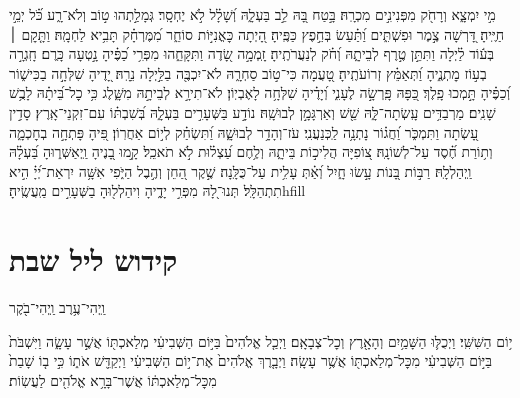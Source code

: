 מִ֣י יִמְצָ֑א וְרָחֹ֖ק מִפְּנִינִ֣ים מִכְרָֽהּ׃ \hfill\break
בָּ֣טַח בָּ֭הּ לֵ֣ב בַּעְלָ֑הּ וְ֝שָׁלָ֗ל לֹ֣א יֶחְסָֽר׃ \hfill\break
גְּמָלַ֣תְהוּ ט֣וֹב וְלֹא־רָ֑ע כֹּ֗֝ל יְמֵ֣י חַיֶּֽיהָ׃ \hfill\break
דָּ֭רְשָׁה צֶ֣מֶר וּפִשְׁתִּ֑ים וַ֝תַּ֗עַשׂ בְּחֵ֣פֶץ כַּפֶּֽיהָ׃ \hfill\break
הָ֭יְתָה כׇּאֳנִיּ֣וֹת סוֹחֵ֑ר מִ֝מֶּרְחָ֗ק תָּבִ֥יא לַחְמָֽהּ׃ \hfill\break
וַתָּ֤קׇם ׀ בְּע֬וֹד לַ֗יְלָה וַתִּתֵּ֣ן טֶ֣רֶף לְבֵיתָ֑הּ וְ֝חֹ֗ק לְנַעֲרֹתֶֽיהָ׃ \hfill\break
זָֽמְמָ֣ה שָׂ֭דֶה וַתִּקָּחֵ֑הוּ מִפְּרִ֥י כַ֝פֶּ֗יהָ נָ֣טְעָה כָּֽרֶם׃ \hfill\break
חָֽגְרָ֣ה בְע֣וֹז מׇתְנֶ֑יהָ וַ֝תְּאַמֵּ֗ץ זְרוֹעֹתֶֽיהָ׃ \hfill\break
טָ֭עֲמָה כִּי־ט֣וֹב סַחְרָ֑הּ לֹא־יִכְבֶּ֖ה בַלַּ֣יְלָה נֵרָֽהּ׃ \hfill\break
יָ֭דֶיהָ שִׁלְּחָ֣ה בַכִּישׁ֑וֹר וְ֝כַפֶּ֗יהָ תָּ֣מְכוּ פָֽלֶךְ׃ \hfill\break
כַּ֭פָּהּ פָּֽרְשָׂ֣ה לֶעָנִ֑י וְ֝יָדֶ֗יהָ שִׁלְּחָ֥ה לָאֶבְיֽוֹן׃ \hfill\break
לֹא־תִירָ֣א לְבֵיתָ֣הּ מִשָּׁ֑לֶג כִּ֥י כׇל־בֵּ֝יתָ֗הּ לָבֻ֥שׁ שָׁנִֽים׃ \hfill\break
מַרְבַדִּ֥ים עָֽשְׂתָה־לָּ֑הּ שֵׁ֖שׁ וְאַרְגָּמָ֣ן לְבוּשָֽׁהּ׃ \hfill\break
נוֹדָ֣ע בַּשְּׁעָרִ֣ים בַּעְלָ֑הּ בְּ֝שִׁבְתּ֗וֹ עִם־זִקְנֵי־אָֽרֶץ׃ \hfill\break
סָדִ֣ין עָ֭שְׂתָה וַתִּמְכֹּ֑ר וַ֝חֲג֗וֹר נָתְנָ֥ה לַֽכְּנַעֲנִֽי׃ \hfill\break
עֹז־וְהָדָ֥ר לְבוּשָׁ֑הּ וַ֝תִּשְׂחַ֗ק לְי֣וֹם אַחֲרֽוֹן׃ \hfill\break
פִּ֭יהָ פָּתְחָ֣ה בְחׇכְמָ֑ה וְת֥וֹרַת חֶ֝֗סֶד עַל־לְשׁוֹנָֽהּ׃ \hfill\break
צ֭וֹפִיָּה הֲלִיכ֣וֹת בֵּיתָ֑הּ וְלֶ֥חֶם עַ֝צְל֗וּת לֹ֣א תֹאכֵֽל׃ \hfill\break
קָ֣מוּ בָ֭נֶיהָ וַֽיְאַשְּׁר֑וּהָ בַּ֝עְלָ֗הּ וַֽיְהַלְלָֽהּ׃ \hfill\break
רַבּ֣וֹת בָּ֭נוֹת עָ֣שׂוּ חָ֑יִל וְ֝אַ֗תְּ עָלִ֥ית עַל־כֻּלָּֽנָה׃ \hfill\break
שֶׁ֣קֶר הַ֭חֵן וְהֶ֣בֶל הַיֹּ֑פִי אִשָּׁ֥ה יִרְאַת־יְ֝יָ֗ הִ֣יא תִתְהַלָּֽל׃ \hfill\break
תְּנוּ־לָ֭הּ מִפְּרִ֣י יָדֶ֑יהָ וִיהַלְל֖וּהָ בַשְּׁעָרִ֣ים מַֽעֲשֶֽׂיהָ׃hfill \break


\section[קידוש ליל שבת]{ קידוש ליל שבת }

\label{shabbatkiddush}
\begin{footnotesize}וַֽיְהִי־עֶ֥רֶב וַֽיְהִי־בֹ֖קֶר\end{footnotesize}
י֥וֹם הַשִּׁשִּֽׁי׃ וַיְכֻלּ֛וּ הַשָּׁמַ֥יִם וְהָאָ֖רֶץ וְכׇל־צְבָאָֽם׃ וַיְכַ֤ל אֱלֹהִים֙ בַּיּ֣וֹם הַשְּׁבִיעִ֔י מְלַאכְתּ֖וֹ אֲשֶׁ֣ר עָשָׂ֑ה וַיִּשְׁבֹּת֙ בַּיּ֣וֹם הַשְּׁבִיעִ֔י מִכׇּל־מְלַאכְתּ֖וֹ אֲשֶׁ֥ר עָשָֽׂה׃ וַיְבָ֤רֶךְ אֱלֹהִים֙ אֶת־י֣וֹם הַשְּׁבִיעִ֔י וַיְקַדֵּ֖שׁ אֹת֑וֹ כִּ֣י ב֤וֹ שָׁבַת֙ מִכׇּל־מְלַאכְתּ֔וֹ אֲשֶׁר־בָּרָ֥א אֱלֹהִ֖ים לַעֲשֽׂוֹת׃

